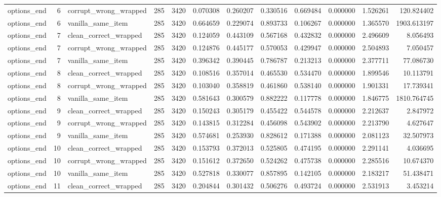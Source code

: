 \begin{tabular}{lrlrrrrrrrrr}
options\_end & 6 & corrupt\_wrong\_wrapped & 285 & 3420 & 0.070308 & 0.260207 & 0.330516 & 0.669484 & 0.000000 & 1.526261 & 120.824402 \\
options\_end & 6 & vanilla\_same\_item & 285 & 3420 & 0.664659 & 0.229074 & 0.893733 & 0.106267 & 0.000000 & 1.365570 & 1903.613197 \\
options\_end & 7 & clean\_correct\_wrapped & 285 & 3420 & 0.124059 & 0.443109 & 0.567168 & 0.432832 & 0.000000 & 2.496609 & 8.056493 \\
options\_end & 7 & corrupt\_wrong\_wrapped & 285 & 3420 & 0.124876 & 0.445177 & 0.570053 & 0.429947 & 0.000000 & 2.504893 & 7.050457 \\
options\_end & 7 & vanilla\_same\_item & 285 & 3420 & 0.396342 & 0.390445 & 0.786787 & 0.213213 & 0.000000 & 2.377711 & 77.086730 \\
options\_end & 8 & clean\_correct\_wrapped & 285 & 3420 & 0.108516 & 0.357014 & 0.465530 & 0.534470 & 0.000000 & 1.899546 & 10.113791 \\
options\_end & 8 & corrupt\_wrong\_wrapped & 285 & 3420 & 0.103040 & 0.358819 & 0.461860 & 0.538140 & 0.000000 & 1.901331 & 17.739341 \\
options\_end & 8 & vanilla\_same\_item & 285 & 3420 & 0.581643 & 0.300579 & 0.882222 & 0.117778 & 0.000000 & 1.846775 & 1810.764745 \\
options\_end & 9 & clean\_correct\_wrapped & 285 & 3420 & 0.150243 & 0.305179 & 0.455422 & 0.544578 & 0.000000 & 2.212637 & 2.847972 \\
options\_end & 9 & corrupt\_wrong\_wrapped & 285 & 3420 & 0.143815 & 0.312284 & 0.456098 & 0.543902 & 0.000000 & 2.213790 & 4.627647 \\
options\_end & 9 & vanilla\_same\_item & 285 & 3420 & 0.574681 & 0.253930 & 0.828612 & 0.171388 & 0.000000 & 2.081123 & 32.507973 \\
options\_end & 10 & clean\_correct\_wrapped & 285 & 3420 & 0.153793 & 0.372013 & 0.525805 & 0.474195 & 0.000000 & 2.291141 & 4.036695 \\
options\_end & 10 & corrupt\_wrong\_wrapped & 285 & 3420 & 0.151612 & 0.372650 & 0.524262 & 0.475738 & 0.000000 & 2.285516 & 10.674370 \\
options\_end & 10 & vanilla\_same\_item & 285 & 3420 & 0.527818 & 0.330077 & 0.857895 & 0.142105 & 0.000000 & 2.183217 & 51.438471 \\
options\_end & 11 & clean\_correct\_wrapped & 285 & 3420 & 0.204844 & 0.301432 & 0.506276 & 0.493724 & 0.000000 & 2.531913 & 3.453214 \\

\end{tabular}
